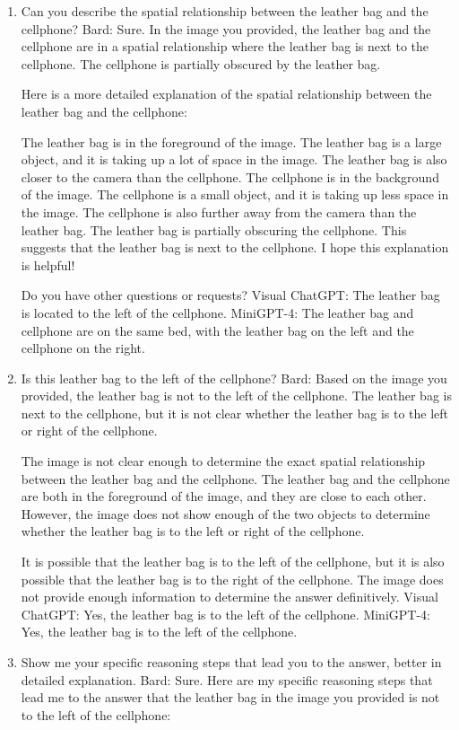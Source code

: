\begin{enumerate}
    \item Can you describe the spatial relationship between the leather bag and the cellphone?
    \subitem Bard: 
    Sure. In the image you provided, the leather bag and the cellphone are in a spatial relationship where the leather bag is next to the cellphone. The cellphone is partially obscured by the leather bag.
    
    Here is a more detailed explanation of the spatial relationship between the leather bag and the cellphone:
    
    The leather bag is in the foreground of the image. The leather bag is a large object, and it is taking up a lot of space in the image. The leather bag is also closer to the camera than the cellphone.
    The cellphone is in the background of the image. The cellphone is a small object, and it is taking up less space in the image. The cellphone is also further away from the camera than the leather bag.
    The leather bag is partially obscuring the cellphone. This suggests that the leather bag is next to the cellphone.
    I hope this explanation is helpful!
    
    Do you have other questions or requests?
    \subitem Visual ChatGPT: The leather bag is located to the left of the cellphone.
    \subitem MiniGPT-4: The leather bag and cellphone are on the same bed, with the leather bag on the left and the cellphone on the right.
    \item Is this leather bag to the left of the cellphone?
    \subitem Bard:
    Based on the image you provided, the leather bag is not to the left of the cellphone. The leather bag is next to the cellphone, but it is not clear whether the leather bag is to the left or right of the cellphone.

    The image is not clear enough to determine the exact spatial relationship between the leather bag and the cellphone. The leather bag and the cellphone are both in the foreground of the image, and they are close to each other. However, the image does not show enough of the two objects to determine whether the leather bag is to the left or right of the cellphone.

    It is possible that the leather bag is to the left of the cellphone, but it is also possible that the leather bag is to the right of the cellphone. The image does not provide enough information to determine the answer definitively.
    \subitem Visual ChatGPT: Yes, the leather bag is to the left of the cellphone.
    \subitem MiniGPT-4: Yes, the leather bag is to the left of the cellphone.
    \item Show me your specific reasoning steps that lead you to the answer, better in detailed explanation.
    \subitem Bard: Sure. Here are my specific reasoning steps that lead me to the answer that the leather bag in the image you provided is not to the left of the cellphone:


\end{enumerate}
